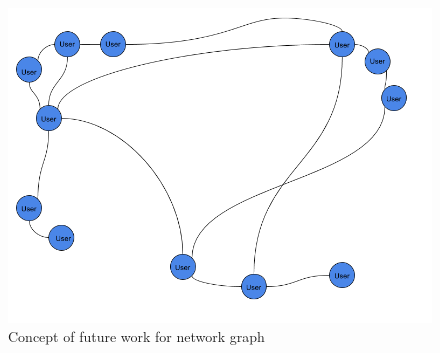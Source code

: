 \documentclass{l4proj}
\begin{document}
\begin{figure}[h]
\includegraphics[scale = 0.5]{Proposed-graph.png}
\centering
\caption{Concept of future work for network graph}
\label{fig:6}
\end{figure}

\begin{appendices}


\end{appendices}




\end{document}
